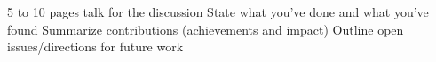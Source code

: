 5 to 10 pages
talk for the discussion
State what you've done and what you've found
Summarize contributions (achievements and impact)
Outline open issues/directions for future work
